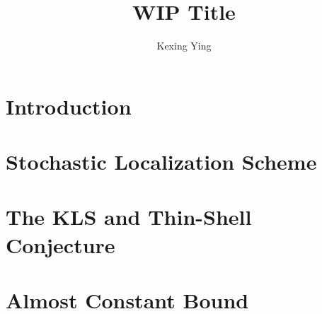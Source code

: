 \documentclass[]{article}
\title{WIP Title}
\author{Kexing Ying}
\theoremstyle{definition}
\begin{document}
\maketitle
\thispagestyle{empty}

\newpage
\tableofcontents
\thispagestyle{empty}

\newpage
\section{Introduction}
\label{sec:introduction}


\newpage
\section{Stochastic Localization Scheme}
\label{sec:stoch_loc}


\newpage
\section{The KLS and Thin-Shell Conjecture}
\label{sec:KLS}



\newpage
\section{Almost Constant Bound}
\label{sec:chen}
 

\newpage


\end{document}
